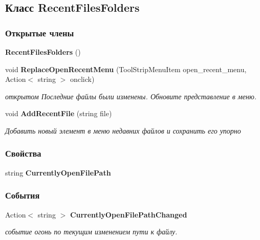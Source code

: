 \subsection{Класс Recent\+Files\+Folders}
\label{classkdz__manager_1_1_recent_files_folders}
\subsubsection*{Открытые члены}
\begin{DoxyCompactItemize}
\item 
{\bf Recent\+Files\+Folders} ()
\item 
void {\bf Replace\+Open\+Recent\+Menu} (Tool\+Strip\+Menu\+Item open\+\_\+recent\+\_\+menu, Action$<$ string $>$ onclick)
\begin{DoxyCompactList}\small\item\em открытом Последние файлы были изменены. Обновите представление в меню. \end{DoxyCompactList}\item 
void {\bf Add\+Recent\+File} (string file)
\begin{DoxyCompactList}\small\item\em Добавить новый элемент в меню недавних файлов и сохранить его упорно \end{DoxyCompactList}\end{DoxyCompactItemize}
\subsubsection*{Свойства}
\begin{DoxyCompactItemize}
\item 
string {\bfseries Currently\+Open\+File\+Path}\hspace{0.3cm}{\ttfamily  [get, set]}\label{classkdz__manager_1_1_recent_files_folders_a69ecdef3984e3864eec1ad459bc98161}

\end{DoxyCompactItemize}
\subsubsection*{События}
\begin{DoxyCompactItemize}
\item 
Action$<$ string $>$ {\bf Currently\+Open\+File\+Path\+Changed}
\begin{DoxyCompactList}\small\item\em событие огонь по текущим изменением пути к файлу. \end{DoxyCompactList}\end{DoxyCompactItemize}


